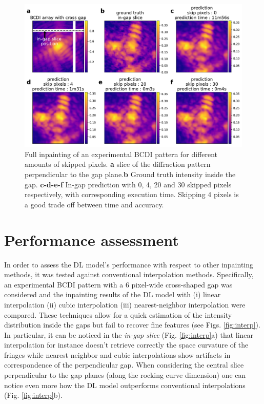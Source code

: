 \begin{figure}[H]
    \centering
    \includegraphics[width=\textwidth]{figures/Inpainting/Skip_pixels_ingap_slice.pdf}
    \caption{Full inpainting of an experimental BCDI pattern for different amounts of skipped pixels. \textbf{a}
    slice of the diffraction pattern perpendicular to the gap plane.\textbf{b} Ground truth intensity inside the gap.
    \textbf{c-d-e-f} In-gap prediction with 0, 4, 20 and 30 skipped pixels respectively, with corresponding 
    execution time. Skipping 4 pixels is a good trade off between time and accuracy.}
    \label{fig:skip_figure}
\end{figure}

\newpage

\section{Performance assessment}\label{sec:performances}

In order to assess the DL model's performance with respect to other inpainting methods, it was tested against 
conventional interpolation methods. Specifically, an experimental BCDI pattern with a 6 pixel-wide 
cross-shaped gap was considered and the inpainting results of the DL model with (i) linear interpolation (ii) cubic interpolation 
(iii) nearest-neighbor interpolation were compared. These techniques allow for a quick estimation of the intensity distribution 
inside the gaps but fail to recover fine features (see Figs. \ref{fig:interp}). In particular, it can be noticed 
in the \textit{in-gap slice} (Fig. \ref{fig:interp}a) that linear interpolation for instance doesn't retrieve correctly 
the space curvature of the fringes while nearest neighbor and cubic interpolations show artifacts in correspondence 
of the perpendicular gap. When considering the central slice perpendicular to the gap planes (along the rocking curve
dimension) one can notice even more how the DL model outperforms conventional interpolations (Fig. \ref{fig:interp}b).
 

